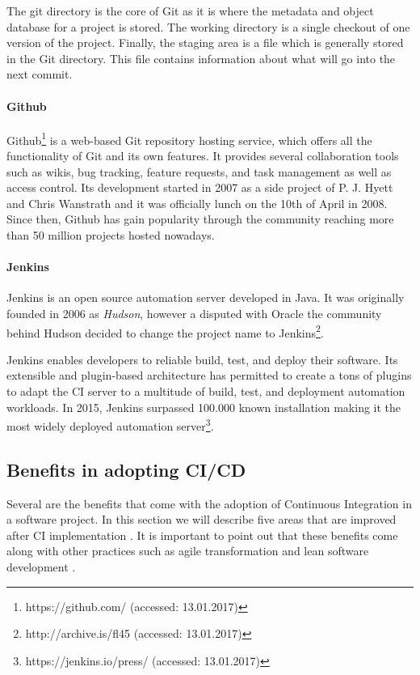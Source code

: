 The git directory is the core of Git as it is where the metadata and object database for a project is stored. The working directory is a single checkout of one version of the project. Finally, the staging area is a file which is generally stored in the Git directory. This file contains information about what will go into the next commit.

\paragraph{Github}

Github\footnote{https://github.com/ (accessed: 13.01.2017)} is a web-based Git repository hosting service, which offers all the functionality of Git and its own features. It provides several collaboration tools such as wikis, bug tracking, feature requests, and task management as well as access control. Its development started in 2007 as a side project of P. J. Hyett and Chris Wanstrath \citep{Weis2014} and it was officially lunch on the 10th of April in 2008. Since then, Github has gain popularity through the community reaching more than 50 million projects hosted nowadays.

\paragraph{Jenkins}
Jenkins is an open source automation server developed in Java. It was originally founded in 2006 as \textit{Hudson}, however a disputed with Oracle the community behind Hudson decided to change the project name to Jenkins\footnote{http://archive.is/fl45 (accessed: 13.01.2017)}.

Jenkins enables developers to reliable build, test, and deploy their software. Its extensible and plugin-based architecture has permitted to create a tons of plugins to adapt the CI server to a multitude of build, test, and deployment automation workloads. In 2015, Jenkins surpassed 100.000 known installation making it the most widely deployed automation server\footnote{https://jenkins.io/press/ (accessed: 13.01.2017)}. 

\subsection{Benefits in adopting CI/CD}
\label{ci-benefits}

Several are the benefits that come with the adoption of Continuous Integration in a software project. In this section we will describe five areas that are improved after CI implementation \citep{Rejstrom2016}. It is important to point out that these benefits come along with other practices such as agile transformation \citep{Laanti2011} and lean software development \citep{Poppendieck2003}.

